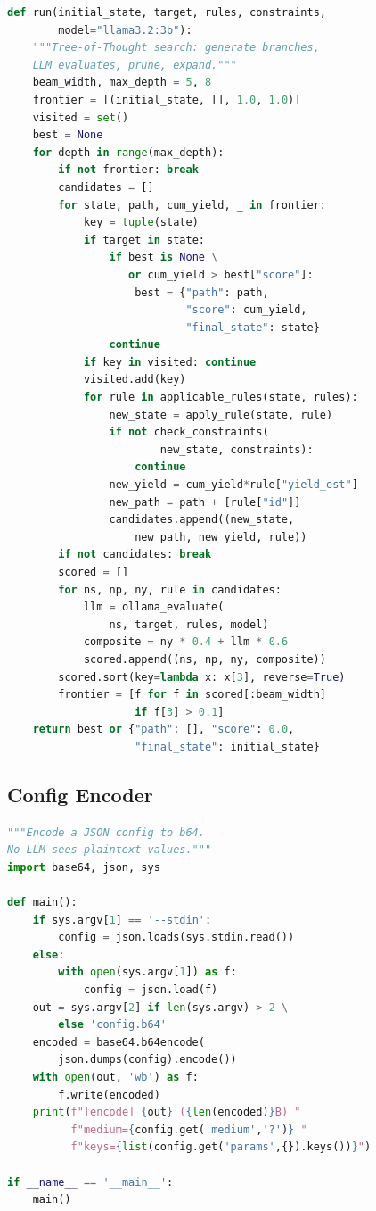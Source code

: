 \documentclass[letterpaper,11pt]{article}
\begin{document}
\begin{lstlisting}[language=Python,caption={tot\_solver.py --- core evaluation and search (abbreviated; 158 lines full)}]
def run(initial_state, target, rules, constraints,
        model="llama3.2:3b"):
    """Tree-of-Thought search: generate branches,
    LLM evaluates, prune, expand."""
    beam_width, max_depth = 5, 8
    frontier = [(initial_state, [], 1.0, 1.0)]
    visited = set()
    best = None
    for depth in range(max_depth):
        if not frontier: break
        candidates = []
        for state, path, cum_yield, _ in frontier:
            key = tuple(state)
            if target in state:
                if best is None \
                   or cum_yield > best["score"]:
                    best = {"path": path,
                            "score": cum_yield,
                            "final_state": state}
                continue
            if key in visited: continue
            visited.add(key)
            for rule in applicable_rules(state, rules):
                new_state = apply_rule(state, rule)
                if not check_constraints(
                        new_state, constraints):
                    continue
                new_yield = cum_yield*rule["yield_est"]
                new_path = path + [rule["id"]]
                candidates.append((new_state,
                    new_path, new_yield, rule))
        if not candidates: break
        scored = []
        for ns, np, ny, rule in candidates:
            llm = ollama_evaluate(
                ns, target, rules, model)
            composite = ny * 0.4 + llm * 0.6
            scored.append((ns, np, ny, composite))
        scored.sort(key=lambda x: x[3], reverse=True)
        frontier = [f for f in scored[:beam_width]
                    if f[3] > 0.1]
    return best or {"path": [], "score": 0.0,
                    "final_state": initial_state}
\end{lstlisting}

\subsection{Config Encoder}\label{app:encode}

\begin{lstlisting}[language=Python,caption={encode.py (22 lines)}]
"""Encode a JSON config to b64.
No LLM sees plaintext values."""
import base64, json, sys

def main():
    if sys.argv[1] == '--stdin':
        config = json.loads(sys.stdin.read())
    else:
        with open(sys.argv[1]) as f:
            config = json.load(f)
    out = sys.argv[2] if len(sys.argv) > 2 \
        else 'config.b64'
    encoded = base64.b64encode(
        json.dumps(config).encode())
    with open(out, 'wb') as f:
        f.write(encoded)
    print(f"[encode] {out} ({len(encoded)}B) "
          f"medium={config.get('medium','?')} "
          f"keys={list(config.get('params',{}).keys())}")

if __name__ == '__main__':
    main()
\end{lstlisting}
\end{document}
